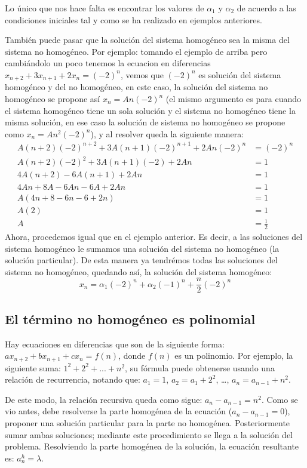 \documentclass{report}
\begin{document}
Lo único que nos hace falta es encontrar los valores de $\alpha_1$ y $\alpha_2$ de acuerdo a las condiciones iniciales tal y como se ha realizado en ejemplos anteriores.

También puede pasar que la solución del sistema homogéneo sea la misma del sistema no homogéneo. Por ejemplo: tomando el ejemplo de arriba pero cambiándolo un poco tenemos la ecuacion en diferencias $x_{n+2}+3x_{n+1}+2x_n=(-2)^n$, vemos que $(-2)^n$ es solución del sistema homogéneo y del no homogéneo, en este caso, la solución del sistema no homogéneo se propone así $x_n=An(-2)^n$ (el mismo argumento es para cuando el sistema homogéneo tiene un sola solución y el sistema no homogéneo tiene la misma solución, en ese caso la solución de sistema no homogéneo se propone como $x_n=An^2(-2)^n$), y al resolver queda la siguiente manera:
\begin{align*}
  A(n+2)(-2)^{n+2}+3A(n+1)(-2)^{n+1}+2An(-2)^n&=(-2)^n\\
  A(n+2)(-2)^2+3A(n+1)(-2)+2An&=1\\
  4A(n+2)-6A(n+1)+2An&=1\\
  4An+8A-6An-6A+2An&=1\\
  A(4n+8-6n-6+2n)&=1\\
  A(2)&=1\\
  A&=\frac{1}{2}
\end{align*}
Ahora, procedemos igual que en el ejemplo anterior. Es decir, a las soluciones del sistema homogéneo le sumamos una solución del sistema no homogéneo (la solución particular). De esta manera ya tendrémos todas las soluciones del sistema no homogéneo, quedando así, la solución del sistema homogéneo:
$$x_n=\alpha_1(-2)^n+\alpha_2(-1)^n+\frac{n}{2}(-2)^n$$
\subsection{El término no homogéneo es polinomial}
\label{sec:polinomial}

Hay ecuaciones en diferencias que son de la siguiente forma: $ax_{n+2}+bx_{n+1}+cx_n=f(n)$, donde $f(n)$ es un polinomio. Por ejemplo, la siguiente suma: $1^2+2^2+...+n^2$, su fórmula puede obtenerse usando una relación de recurrencia, notando que:
$a_1=1$, $a_2=a_1+2^2$, \dots, $a_n=a_{n-1}+n^2$.


De este modo, la relación recursiva queda como sigue:
$a_{n}-a_{n-1}=n^2$.  Como se vio antes, debe resolverse la parte
homogénea de la ecuación ($a_n-a_{n-1}=0$), proponer una solución
particular para la parte no homogénea. Posteriormente sumar ambas
soluciones; mediante este procedimiento se llega a la solución del problema.
Resolviendo la parte homogénea de la solución, la ecuación resultante
es: $a^h_n=\lambda$.
\end{document}
